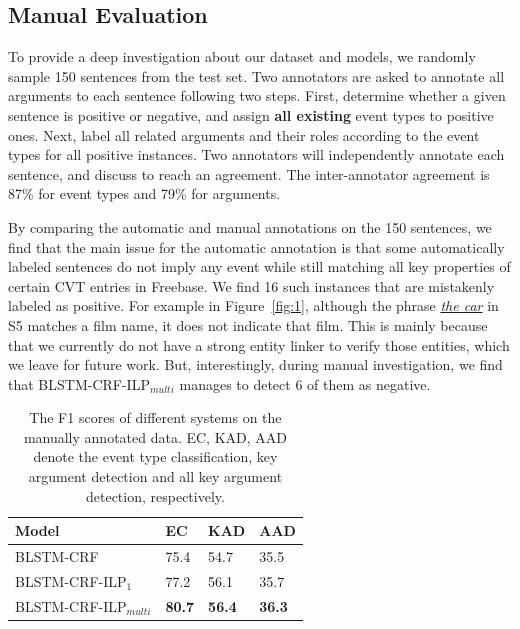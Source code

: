 \subsection{Manual Evaluation}\label{manualeve}
To provide a deep investigation about our dataset and models, we randomly sample 150 sentences 
from the test set. Two annotators are asked to annotate all arguments to each sentence following 
two steps. First, determine whether a given sentence is positive or negative, and assign \textbf{all existing} 
event types to positive ones. Next, label all related arguments and their roles according to 
the event types for all positive instances. Two annotators will independently annotate each sentence, 
and discuss to reach an agreement. The inter-annotator agreement is 87\% for event types and 79\% for arguments.


By comparing the automatic and manual annotations on the 150 sentences, we find that 
the main issue for the automatic annotation is that some automatically labeled sentences 
do not imply any event while still matching all key properties of certain CVT entries in Freebase. 
We find 16 such instances that are mistakenly labeled as positive. 
For example in Figure~\ref{fig:1}, although the phrase \underline{\emph{the car}} in S5 matches a film name, 
it does not indicate that film. %
This is mainly because that we currently do not have a strong entity linker to verify those entities, which we leave for
future work.
But, interestingly, 
during manual investigation, 
we find that BLSTM-CRF-ILP$_{multi}$ manages to detect 6 of them as negative.


\begin{table}[h]
\small
\centering
\begin{tabular}{|l|p{0.8cm}<{\centering}|p{0.8cm}<{\centering}|p{0.8cm}<{\centering}|} \hline
	Model & EC & KAD & AAD \\ \hline
	BLSTM-CRF & 75.4 & 54.7 & 35.5 \\ \hline
	BLSTM-CRF-ILP$_{1}$ & 77.2 & 56.1 & 35.7 \\ \hline
	BLSTM-CRF-ILP$_{multi}$ & \textbf{80.7} & \textbf{56.4} & \textbf{36.3} \\ \hline
\end{tabular}
\caption{The F1 scores of different systems on the manually annotated data. EC, KAD, AAD denote the event type classification, key argument detection and all key argument detection, respectively. \label{tab:2}}
\end{table}

